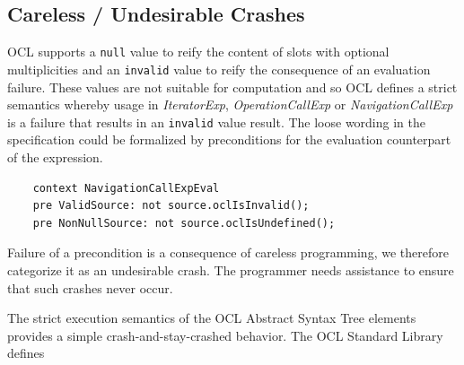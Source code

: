 \documentclass[
]{ceurart}
\begin{document}





\subsection{Careless / Undesirable Crashes}

OCL supports a \verb|null| value to reify the content of slots with optional multiplicities and an \verb|invalid| value to reify the consequence of an evaluation failure. These values are not suitable for computation and so OCL defines a strict semantics whereby usage in \emph{IteratorExp}, \emph{OperationCallExp} or \emph{NavigationCallExp} is a failure that results in an \verb|invalid| value result.
The loose wording in the specification could be formalized by preconditions for the evaluation counterpart of the expression.

\begin{verbatim}
    context NavigationCallExpEval
    pre ValidSource: not source.oclIsInvalid();
    pre NonNullSource: not source.oclIsUndefined();
\end{verbatim}

Failure of a precondition is a consequence of careless programming, we therefore categorize it as an undesirable crash. The programmer needs assistance to ensure that such crashes never occur.

The strict execution semantics of the OCL Abstract Syntax Tree elements provides a simple crash-and-stay-crashed behavior. The OCL Standard Library defines
\end{document}
